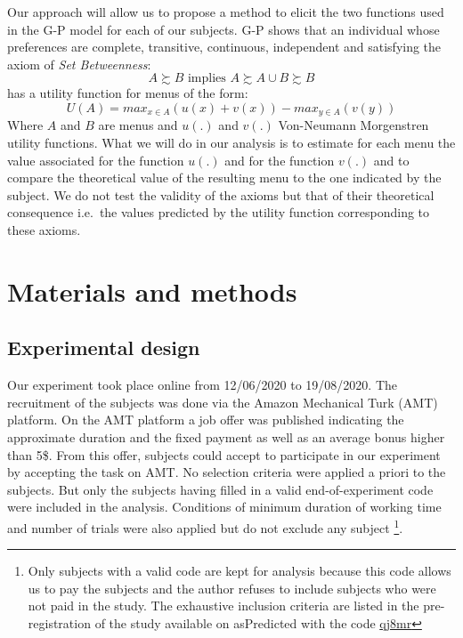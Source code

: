 \documentclass[
]{book}
\begin{document}
Our approach will allow us to propose a method to elicit the two
functions used in the G-P model for each of our subjects.
G-P shows that an individual whose preferences are complete, transitive,
continuous, independent and satisfying the axiom of \emph{Set Betweenness}:
\[
A \succsim B \text{ implies } A \succsim A\cup B \succsim B
\]
has a utility function for menus of the form:
\[
U(A) = max_{x \in A}(u(x) + v(x)) - max_{y \in A}(v(y))
\]
Where \(A\) and \(B\) are menus and \(u(.)\) and \(v(.)\) Von-Neumann Morgenstren
utility functions.
What we will do in our analysis is to estimate for each menu the value
associated for the function \(u(.)\) and for the function \(v(.)\) and to compare
the theoretical value of the resulting menu to the one indicated by the subject.
We do not test the validity of the axioms but that of their theoretical
consequence i.e.~the values predicted by the utility function corresponding to
these axioms.

\hypertarget{mm3}{%
\section{Materials and methods}\label{mm3}}

\hypertarget{experimental-design}{%
\subsection{Experimental design}\label{experimental-design}}

Our experiment took place online from 12/06/2020 to 19/08/2020.
The recruitment of the subjects was done via the Amazon
Mechanical Turk (AMT) platform.
On the AMT platform a job offer was published indicating the approximate
duration and the fixed payment as well as an average bonus higher than 5\$.
From this offer, subjects could accept to participate in our experiment by
accepting the task on AMT.
No selection criteria were applied a priori to the subjects. But only the subjects having filled in a valid end-of-experiment code were included in the analysis. Conditions of minimum duration of working time and number of trials were also applied but do not exclude any subject \footnote{Only subjects with a valid code are kept for analysis because this code allows us to pay the subjects and the author refuses to include subjects who were not paid in the study. The exhaustive inclusion criteria are listed in the pre-registration of the study available on asPredicted with the code
  \href{https://aspredicted.org/qj8mr.pdf}{qj8mr}}.
\end{document}
